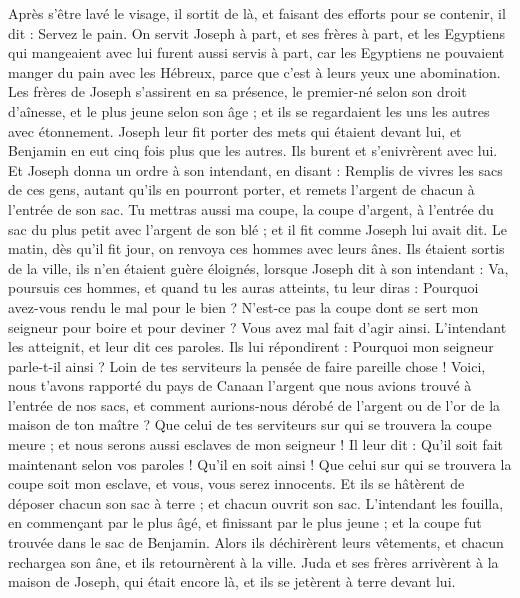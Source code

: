 \begin{multicols}{2}
Après s'être lavé le visage, il sortit de là, et faisant des efforts pour se contenir, il dit : Servez le pain.
On servit Joseph à part, et ses frères à part, et les Egyptiens qui mangeaient avec lui furent aussi servis à part, car les Egyptiens ne pouvaient manger du pain avec les Hébreux, parce que c'est à leurs yeux une abomination.
Les frères de Joseph s'assirent en sa présence, le premier-né selon son droit d'aînesse, et le plus jeune selon son âge ; et ils se regardaient les uns les autres avec étonnement.
Joseph leur fit porter des mets qui étaient devant lui, et Benjamin en eut cinq fois plus que les autres. Ils burent et s'enivrèrent avec lui.
\VerseOne{}Et Joseph donna un ordre à son intendant, en disant : Remplis de vivres les sacs de ces gens, autant qu'ils en pourront porter, et remets l'argent de chacun à l'entrée de son sac.
Tu mettras aussi ma coupe, la coupe d'argent, à l'entrée du sac du plus petit avec l'argent de son blé ; et il fit comme Joseph lui avait dit.
Le matin, dès qu'il fit jour, on renvoya ces hommes avec leurs ânes.
Ils étaient sortis de la ville, ils n'en étaient guère éloignés, lorsque Joseph dit à son intendant : Va, poursuis ces hommes, et quand tu les auras atteints, tu leur diras : Pourquoi avez-vous rendu le mal pour le bien ?
N'est-ce pas la coupe dont se sert mon seigneur pour boire et pour deviner ? Vous avez mal fait d'agir ainsi.
L'intendant les atteignit, et leur dit ces paroles.
Ils lui répondirent : Pourquoi mon seigneur parle-t-il ainsi ? Loin de tes serviteurs la pensée de faire pareille chose !
Voici, nous t'avons rapporté du pays de Canaan l'argent que nous avions trouvé à l'entrée de nos sacs, et comment aurions-nous dérobé de l'argent ou de l'or de la maison de ton maître ?
Que celui de tes serviteurs sur qui se trouvera la coupe meure ; et nous serons aussi esclaves de mon seigneur !
Il leur dit : Qu'il soit fait maintenant selon vos paroles ! Qu'il en soit ainsi ! Que celui sur qui se trouvera la coupe soit mon esclave, et vous, vous serez innocents.
Et ils se hâtèrent de déposer chacun son sac à terre ; et chacun ouvrit son sac.
L'intendant les fouilla, en commençant par le plus âgé, et finissant par le plus jeune ; et la coupe fut trouvée dans le sac de Benjamin.
Alors ils déchirèrent leurs vêtements, et chacun rechargea son âne, et ils retournèrent à la ville.
Juda et ses frères arrivèrent à la maison de Joseph, qui était encore là, et ils se jetèrent à terre devant lui.

\end{multicols}
